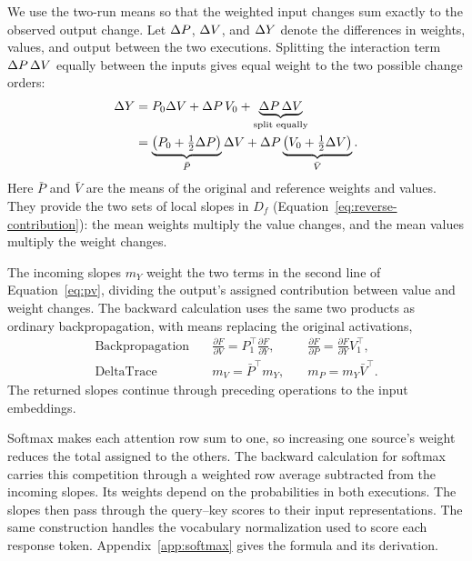 We use the two-run means so that the weighted input changes sum exactly to the observed output change. Let $\Delta P$, $\Delta V$, and $\Delta Y$ denote the differences in weights, values, and output between the two executions. Splitting the interaction term $\Delta P\,\Delta V$ equally between the inputs gives equal weight to the two possible change orders:
\begin{equation}
\begin{aligned}
\Delta Y
&=P_0\Delta V+\Delta P\,V_0+\underbrace{\Delta P\,\Delta V}_{\text{split equally}}\\
&=\underbrace{\left(P_0+\tfrac12\Delta P\right)}_{\bar P}\Delta V
+\Delta P\underbrace{\left(V_0+\tfrac12\Delta V\right)}_{\bar V}.
\end{aligned}
\label{eq:pv}
\end{equation}
Here $\bar P$ and $\bar V$ are the means of the original and reference weights and values. They provide the two sets of local slopes in $D_f$ (Equation~\ref{eq:reverse-contribution}): the mean weights multiply the value changes, and the mean values multiply the weight changes.

The incoming slopes $m_Y$ weight the two terms in the second line of Equation~\ref{eq:pv}, dividing the output's assigned contribution between value and weight changes. The backward calculation uses the same two products as ordinary backpropagation, with means replacing the original activations,
\begin{equation}
\begin{aligned}
\text{Backpropagation}\quad &
\frac{\partial F}{\partial V}=P_1^\top\frac{\partial F}{\partial Y},
&\quad \frac{\partial F}{\partial P}=\frac{\partial F}{\partial Y}V_1^\top,\\
\text{DeltaTrace}\quad &
m_V=\bar P^\top m_Y,
&\quad m_P=m_Y\bar V^\top.
\end{aligned}
\label{eq:pv-reverse}
\end{equation}
The returned slopes continue through preceding operations to the input embeddings.

Softmax makes each attention row sum to one, so increasing one source's weight reduces the total assigned to the others. The backward calculation for softmax carries this competition through a weighted row average subtracted from the incoming slopes. Its weights depend on the probabilities in both executions. The slopes then pass through the query--key scores to their input representations. The same construction handles the vocabulary normalization used to score each response token. Appendix~\ref{app:softmax} gives the formula and its derivation.

